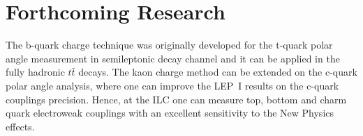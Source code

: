 \color{DarkSlateGray} %


\section*{Forthcoming Research}
The b-quark charge technique was originally developed for the t-quark polar angle measurement in semileptonic decay channel and it can be applied in the fully hadronic $t\bar{t}$ decays.
The kaon charge method can be extended on the c-quark polar angle analysis, where one can improve the LEP~I results on the c-quark couplings precision. 
Hence, at the ILC one can measure top, bottom and charm quark electroweak couplings with an excellent sensitivity to the New Physics effects.






